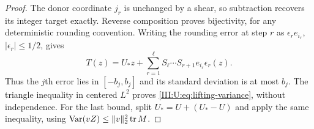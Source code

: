 \begin{proof}
The donor coordinate $j_r$ is unchanged by a shear, so subtraction
recovers its integer target exactly. Reverse composition proves
bijectivity, for any deterministic rounding convention.
Writing the rounding error at step $r$ as $\epsilon_r e_{i_r}$,
$|\epsilon_r|\le1/2$, gives
\[
 T(z)=U_*z+\sum_{r=1}^\ell
            S_\ell\cdots S_{r+1}e_{i_r}\epsilon_r(z).
\]
Thus the $j$th error lies in $[-b_j,b_j]$ and its standard deviation
is at most $b_j$. The triangle inequality in centered $L^2$ proves
\eqref{III:U:eq:lifting-variance}, without independence. For the last
bound, split $U_*=U+(U_*-U)$ and apply the same inequality, using
$\operatorname{Var}(vZ)\le\|v\|_2^2\operatorname{tr} M$.
\end{proof}
